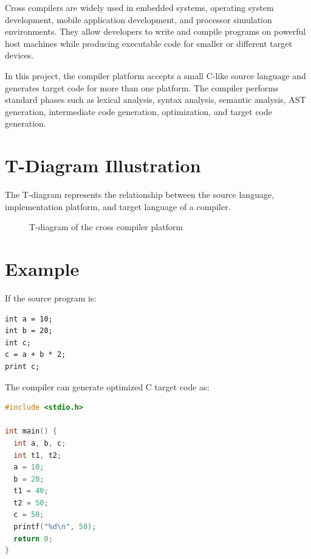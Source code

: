 \documentclass[12pt,a4paper]{report}
\begin{document}
Cross compilers are widely used in embedded systems, operating system development, mobile application development, and processor simulation environments. They allow developers to write and compile programs on powerful host machines while producing executable code for smaller or different target devices.

In this project, the compiler platform accepts a small C-like source language and generates target code for more than one platform. The compiler performs standard phases such as lexical analysis, syntax analysis, semantic analysis, AST generation, intermediate code generation, optimization, and target code generation.

\section{T-Diagram Illustration}
The T-diagram represents the relationship between the source language, implementation platform, and target language of a compiler.

\begin{figure}[H]
    \centering
    \caption{T-diagram of the cross compiler platform}
\end{figure}

\section{Example}
If the source program is:

\begin{lstlisting}
int a = 10;
int b = 20;
int c;
c = a + b * 2;
print c;
\end{lstlisting}

The compiler can generate optimized C target code as:

\begin{lstlisting}[language=C]
#include <stdio.h>

int main() {
  int a, b, c;
  int t1, t2;
  a = 10;
  b = 20;
  t1 = 40;
  t2 = 50;
  c = 50;
  printf("%d\n", 50);
  return 0;
}
\end{lstlisting}
\end{document}
